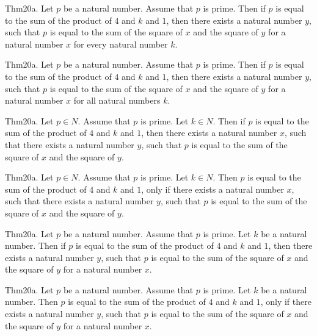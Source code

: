 \documentclass{article}
\begin{document}
Thm20a. Let $p$ be a natural number. Assume that $p$ is prime. Then if $p$ is equal to the sum of the product of $4$ and $k$ and $1$, then there exists a natural number $y$, such that $p$ is equal to the sum of the square of $x$ and the square of $y$ for a natural number $x$ for every natural number $k$.

Thm20a. Let $p$ be a natural number. Assume that $p$ is prime. Then if $p$ is equal to the sum of the product of $4$ and $k$ and $1$, then there exists a natural number $y$, such that $p$ is equal to the sum of the square of $x$ and the square of $y$ for a natural number $x$ for all natural numbers $k$.

Thm20a. Let $p \in N$. Assume that $p$ is prime. Let $k \in N$. Then if $p$ is equal to the sum of the product of $4$ and $k$ and $1$, then there exists a natural number $x$, such that there exists a natural number $y$, such that $p$ is equal to the sum of the square of $x$ and the square of $y$.

Thm20a. Let $p \in N$. Assume that $p$ is prime. Let $k \in N$. Then $p$ is equal to the sum of the product of $4$ and $k$ and $1$, only if there exists a natural number $x$, such that there exists a natural number $y$, such that $p$ is equal to the sum of the square of $x$ and the square of $y$.

Thm20a. Let $p$ be a natural number. Assume that $p$ is prime. Let $k$ be a natural number. Then if $p$ is equal to the sum of the product of $4$ and $k$ and $1$, then there exists a natural number $y$, such that $p$ is equal to the sum of the square of $x$ and the square of $y$ for a natural number $x$.

Thm20a. Let $p$ be a natural number. Assume that $p$ is prime. Let $k$ be a natural number. Then $p$ is equal to the sum of the product of $4$ and $k$ and $1$, only if there exists a natural number $y$, such that $p$ is equal to the sum of the square of $x$ and the square of $y$ for a natural number $x$.
\end{document}
